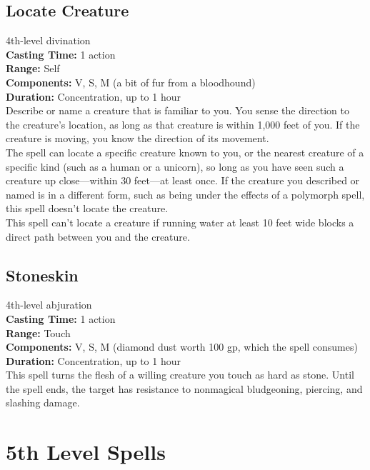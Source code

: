 \documentclass[11pt, A4paper, english]{article}
\begin{document}
		\subsection{Locate Creature}
4th-level divination \\
\textbf{Casting Time:} 1 action \\
\textbf{Range:} Self \\
\textbf{Components:} V, S, M (a bit of fur from a bloodhound) \\
\textbf{Duration:} Concentration, up to 1 hour \\
Describe or name a creature that is familiar to you. You sense the direction to the creature’s location, as long as that creature is within 1,000 feet of you. If the creature is moving, you know the direction of its movement. \\
The spell can locate a specific creature known to you, or the nearest creature of a specific kind (such as a human or a unicorn), so long as you have seen such a creature up close—within 30 feet—at least once. If the creature you described or named is in a different form, such as being under the effects of a polymorph spell, this spell doesn’t locate the creature. \\
This spell can’t locate a creature if running water at least 10 feet wide blocks a direct path between you and the creature.

		\subsection{Stoneskin}
4th-level abjuration \\
\textbf{Casting Time:} 1 action \\
\textbf{Range:} Touch \\
\textbf{Components:} V, S, M (diamond dust worth 100 gp, which the spell consumes) \\
\textbf{Duration:} Concentration, up to 1 hour \\
This spell turns the flesh of a willing creature you touch as hard as stone. Until the spell ends, the target has resistance to nonmagical bludgeoning, piercing, and slashing damage.



	\section{5th Level Spells}
\end{document}
